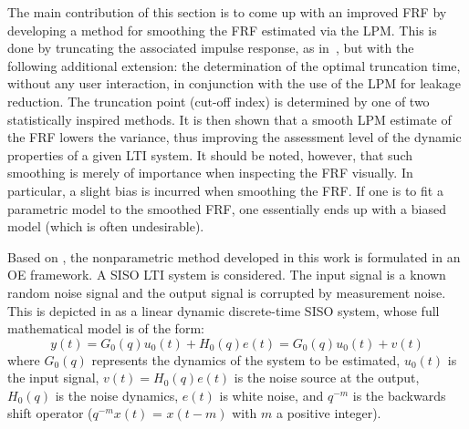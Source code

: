 \label{sec:nonparametric:truncation}


The main contribution of this section is to come up with an improved \gls{FRF} by developing a method for smoothing the \gls{FRF} estimated via the \gls{LPM}. 
This is done by truncating the associated impulse response, as in~\citet{Schoukens1998}, but with the following additional extension: the determination of the optimal truncation time, without any user interaction, in conjunction with the use of the \gls{LPM} for leakage reduction. 
The truncation point (cut-off index) is determined by one of two statistically inspired methods.
It is then shown that a smooth \gls{LPM} estimate of the \gls{FRF} lowers the variance, thus improving the assessment level of the dynamic properties of a given \gls{LTI} system.
It should be noted, however, that such smoothing is merely of importance when inspecting the \gls{FRF} visually.
In particular, a slight bias is incurred when smoothing the \gls{FRF}.
If one is to fit a parametric model to the smoothed \gls{FRF}, one essentially ends up with a biased model (which is often undesirable).

Based on \citet{Schoukens2009LPM}, the nonparametric method developed in this work is formulated in an \gls{OE} framework. 
A \gls{SISO} \gls{LTI} system is considered.
The input signal is a known random noise signal and the output signal is corrupted by measurement noise. This is depicted in  as a linear dynamic discrete-time \gls{SISO} system, whose full mathematical model is of the form:
\begin{equation}\label{eq:nparam:trunc:LPM:TD}
y(t)=G_0(q)u_0(t)+H_0(q)e(t)=G_0(q)u_0(t)+v(t)
\end{equation}
where $G_0(q)$ represents the dynamics of the system to be estimated, $u_0(t)$ is the input signal, $v(t)= H_0(q)e(t)$ is the noise source at the output, $H_0(q)$ is the noise dynamics, $e(t)$ is white noise, and $q^{-m}$ is the backwards shift operator ($q^{-m}x(t)$ = $x(t-m)$  with $m$ a positive integer).


